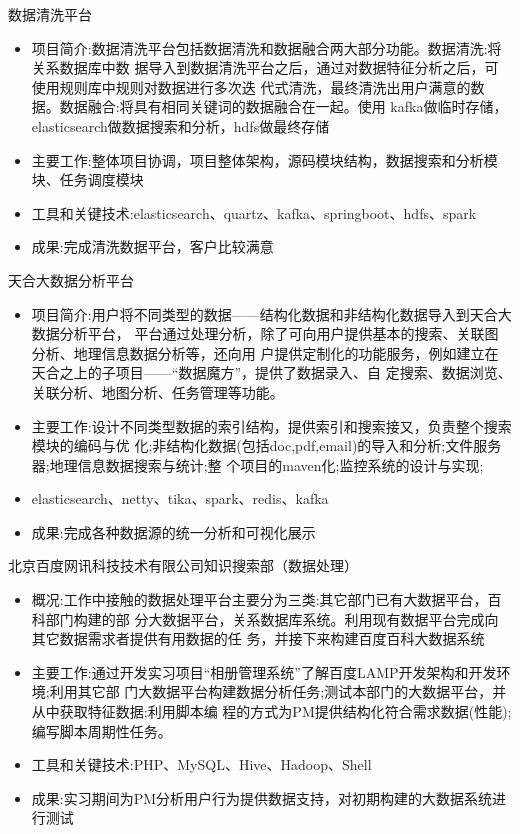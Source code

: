 \documentclass{resume}
\begin{document}
\begin{onehalfspacing}
数据清洗平台
\begin{itemize}
  \item 项目简介:数据清洗平台包括数据清洗和数据融合两大部分功能。数据清洗:将关系数据库中数 据导入到数据清洗平台之后，通过对数据特征分析之后，可使用规则库中规则对数据进行多次迭 代式清洗，最终清洗出用户满意的数据。数据融合:将具有相同关键词的数据融合在一起。使用 kafka做临时存储，elasticsearch做数据搜索和分析，hdfs做最终存储
  \item 主要工作:整体项目协调，项目整体架构，源码模块结构，数据搜索和分析模块、任务调度模块
  \item 工具和关键技术:elasticsearch、quartz、kafka、springboot、hdfs、spark
  \item 成果:完成清洗数据平台，客户比较满意
\end{itemize}
\end{onehalfspacing}
\begin{onehalfspacing}
天合大数据分析平台
\begin{itemize}
  \item 项目简介:用户将不同类型的数据——结构化数据和非结构化数据导入到天合大数据分析平台， 平台通过处理分析，除了可向用户提供基本的搜索、关联图分析、地理信息数据分析等，还向用 户提供定制化的功能服务，例如建立在天合之上的子项目——“数据魔方”，提供了数据录入、自 定搜索、数据浏览、关联分析、地图分析、任务管理等功能。
  \item 主要工作:设计不同类型数据的索引结构，提供索引和搜索接又，负责整个搜索模块的编码与优 化;非结构化数据(包括doc,pdf,email)的导入和分析;文件服务器;地理信息数据搜索与统计;整 个项目的maven化;监控系统的设计与实现;
  \item elasticsearch、netty、tika、spark、redis、kafka
  \item 成果:完成各种数据源的统一分析和可视化展示
\end{itemize}
\end{onehalfspacing}

\begin{onehalfspacing}
北京百度网讯科技技术有限公司知识搜索部（数据处理）
\begin{itemize}
  \item 概况:工作中接触的数据处理平台主要分为三类:其它部门已有大数据平台，百科部门构建的部 分大数据平台，关系数据库系统。利用现有数据平台完成向其它数据需求者提供有用数据的任 务，并接下来构建百度百科大数据系统
  \item 主要工作:通过开发实习项目“相册管理系统”了解百度LAMP开发架构和开发环境;利用其它部 门大数据平台构建数据分析任务;测试本部门的大数据平台，并从中获取特征数据;利用脚本编 程的方式为PM提供结构化符合需求数据(性能);编写脚本周期性任务。
  \item 工具和关键技术:PHP、MySQL、Hive、Hadoop、Shell
  \item 成果:实习期间为PM分析用户行为提供数据支持，对初期构建的大数据系统进行测试
\end{itemize}
\end{onehalfspacing}
\end{document}
